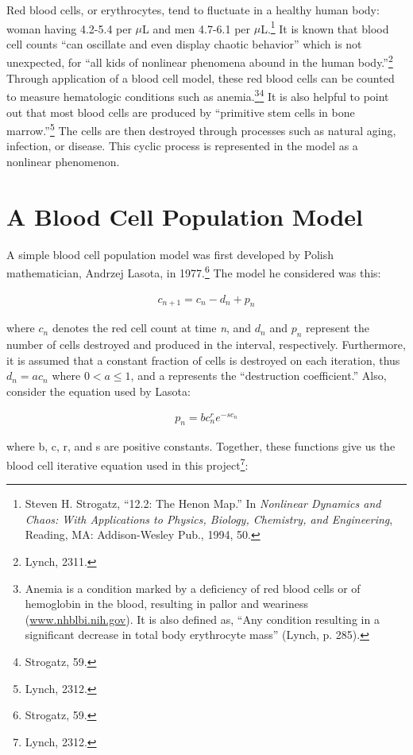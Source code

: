 	Red blood cells, or erythrocytes, tend to fluctuate in a healthy human body: woman having 4.2-5.4 per $\mu$L and men 4.7-6.1 per $\mu$L.\footnote{Steven H. Strogatz, ``12.2: The Henon Map.'' In \emph{Nonlinear Dynamics and Chaos: With Applications to Physics, Biology, Chemistry, and Engineering}, Reading, MA: Addison-Wesley Pub., 1994, 50.} It is known that blood cell counts ``can oscillate and even display chaotic behavior'' which is not unexpected, for ``all kids of nonlinear phenomena abound in the human body.''\footnote{Lynch, 2311.} Through application of a blood cell model, these red blood cells can be counted to measure hematologic conditions such as anemia.\footnote{Anemia is a condition marked by a deficiency of red blood cells or of hemoglobin in the blood, resulting in pallor and weariness (\url{www.nhblbi.nih.gov}). It is also defined as, ``Any condition resulting in a significant decrease in total body erythrocyte mass'' (Lynch, p. 285).}\footnote{Strogatz, 59.} It is also helpful to point out that most blood cells are produced by ``primitive stem cells in bone marrow.''\footnote{Lynch, 2312.} The cells are then destroyed through processes such as natural aging, infection, or disease. This cyclic process is represented in the model as a nonlinear phenomenon. 
	
\section*{A Blood Cell Population Model}
	
	A simple blood cell population model was first developed by Polish mathematician, Andrzej Lasota, in 1977.\footnote{Strogatz, 59.} The model he considered was this:
	
	\begin{align}
		c_{n+1} = c_{n} - d_{n} + p_{n}
	\end{align}

	where $c_{n}$ denotes the red cell count at time \emph{n}, and $d_{n}$ and $p_{n}$ represent the number of cells destroyed and produced in the interval, respectively. Furthermore, it is assumed that a constant fraction of cells is destroyed on each iteration, thus $d_{n} = ac_{n}$ where $0 < a \le 1$, and a represents the ``destruction coefficient.''  Also, consider the equation used by Lasota: 
	
	\begin{align}
		p_{n} = bc_{n}^{r}e^{-sc_{n}}
	\end{align}

	where b, c, r, and s are positive constants. Together, these functions give us the blood cell iterative equation used in this project\footnote{Lynch, 2312.}:

